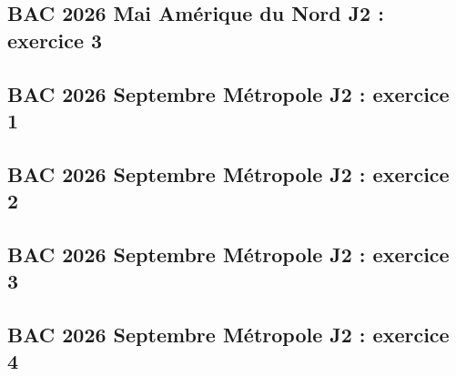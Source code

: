 \documentclass[lang=fr,edition=teacher,layout=sheet]{mxbook}
\begin{document}
\par\bigskip
{}\subsection*{BAC 2026 Mai Amérique du Nord J2 : exercice 3}
\begingroup\endgroup
\par\bigskip
{}\subsection*{BAC 2026 Septembre Métropole J2 : exercice 1}
\begingroup\endgroup
\par\bigskip
{}\subsection*{BAC 2026 Septembre Métropole J2 : exercice 2}
\begingroup\endgroup
\par\bigskip
{}\subsection*{BAC 2026 Septembre Métropole J2 : exercice 3}
\begingroup\endgroup
\par\bigskip
{}\subsection*{BAC 2026 Septembre Métropole J2 : exercice 4}
\begingroup\endgroup
\par\bigskip
\end{document}
